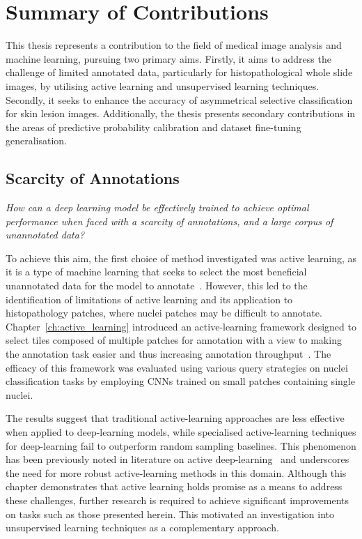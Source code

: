 \section{Summary of Contributions}
This thesis represents a contribution to the field of medical image analysis and machine learning, pursuing two primary aims. Firstly, it aims to address the challenge of limited annotated data, particularly for histopathological whole slide images, by utilising active learning and unsupervised learning techniques. Secondly, it seeks to enhance the accuracy of asymmetrical selective classification for skin lesion images. Additionally, the thesis presents secondary contributions in the areas of predictive probability calibration and dataset fine-tuning generalisation.

\subsection{Scarcity of Annotations}
\textit{How can a deep learning model be effectively trained to achieve optimal performance when faced with a scarcity of annotations, and a large corpus of unannotated data?}

To achieve this aim, the first choice of method investigated was active learning, as it is a type of machine learning that seeks to select the most beneficial unannotated data for the model to annotate~\citep{settles2009active}. However, this led to the identification of limitations of active learning and its application to histopathology patches, where nuclei patches may be difficult to annotate. Chapter~\ref{ch:active_learning} introduced an active-learning framework designed to select tiles composed of multiple patches for annotation with a view to making the annotation task easier and thus increasing annotation throughput~\citep{carse2019active}. The efficacy of this framework was evaluated using various query strategies on nuclei classification tasks by employing CNNs trained on small patches containing single nuclei. 

The results suggest that traditional active-learning approaches are less effective when applied to deep-learning models, while specialised active-learning techniques for deep-learning fail to outperform random sampling baselines. This phenomenon has been previously noted in literature on active deep-learning~\citep{ren2021survey} and underscores the need for more robust active-learning methods in this domain. Although this chapter demonstrates that active learning holds promise as a means to address these challenges, further research is required to achieve significant improvements on tasks such as those presented herein. This motivated an investigation into unsupervised learning techniques as a complementary approach.

